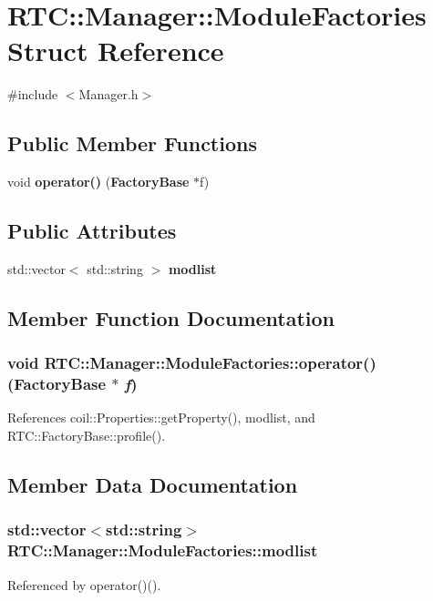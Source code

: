 \section{RTC::Manager::ModuleFactories Struct Reference}
\label{structRTC_1_1Manager_1_1ModuleFactories}


{\ttfamily \#include $<$Manager.h$>$}

\subsection*{Public Member Functions}
\begin{DoxyCompactItemize}
\item 
void {\bf operator()} ({\bf FactoryBase} $\ast$f)
\end{DoxyCompactItemize}
\subsection*{Public Attributes}
\begin{DoxyCompactItemize}
\item 
std::vector$<$ std::string $>$ {\bf modlist}
\end{DoxyCompactItemize}


\subsection{Member Function Documentation}
\subsubsection[{operator()}]{\setlength{\rightskip}{0pt plus 5cm}void RTC::Manager::ModuleFactories::operator() ({\bf FactoryBase} $\ast$ {\em f})\hspace{0.3cm}{\ttfamily  [inline]}}\label{structRTC_1_1Manager_1_1ModuleFactories_a60f104208930ef04a6977f30f3498445}


References coil::Properties::getProperty(), modlist, and RTC::FactoryBase::profile().



\subsection{Member Data Documentation}
\subsubsection[{modlist}]{\setlength{\rightskip}{0pt plus 5cm}std::vector$<$std::string$>$ {\bf RTC::Manager::ModuleFactories::modlist}}\label{structRTC_1_1Manager_1_1ModuleFactories_a92469a60138308285e8112b60afa1faa}


Referenced by operator()().

